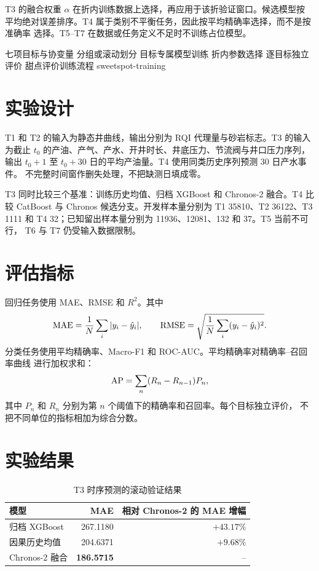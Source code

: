 T3 的融合权重 $\alpha$ 在折内训练数据上选择，再应用于该折验证窗口。候选模型按
平均绝对误差排序。T4 属于类别不平衡任务，因此按平均精确率选择，而不是按准确率
选择。T5--T7 在数据或任务定义不足时不训练占位模型。

\TrainingFlow
  {七项目标与协变量}
  {分组或滚动划分}
  {目标专属模型训练}
  {折内参数选择}
  {逐目标独立评价}
  {甜点评价训练流程}
  {sweetspot-training}

\section{实验设计}

T1 和 T2 的输入为静态井曲线，输出分别为 RQI 代理量与砂岩标志。T3 的输入为截止
$t_0$ 的产油、产气、产水、开井时长、井底压力、节流阀与井口压力序列，输出
$t_0+1$ 至 $t_0+30$ 日的平均产油量。T4 使用同类历史序列预测 30 日产水事件。
不完整时间窗作删失处理，不把缺测日填成零。

T3 同时比较三个基准：训练历史均值、归档 XGBoost 和 Chronos-2 融合。T4 比较
CatBoost 与 Chronos 候选分支。开发样本量分别为 T1 35810、T2 36122、T3 1111
和 T4 32；已知留出样本量分别为 11936、12081、132 和 37。T5 当前不可行，
T6 与 T7 仍受输入数据限制。

\section{评估指标}

回归任务使用 MAE、RMSE 和 $R^2$。其中
\begin{equation}
  \mathrm{MAE}=\frac{1}{N}\sum_i|y_i-\hat{y}_i|,
  \qquad
  \mathrm{RMSE}=\sqrt{\frac{1}{N}\sum_i(y_i-\hat{y}_i)^2}.
\end{equation}
分类任务使用平均精确率、Macro-F1 和 ROC-AUC。平均精确率对精确率--召回率曲线
进行加权求和：
\begin{equation}
  \mathrm{AP}=\sum_n(R_n-R_{n-1})P_n,
\end{equation}
其中 $P_n$ 和 $R_n$ 分别为第 $n$ 个阈值下的精确率和召回率。每个目标独立评价，
不把不同单位的指标相加为综合分数。

\section{实验结果}

\begin{table}[htbp]
  \centering
  \caption{T3 时序预测的滚动验证结果}
  \label{tab:sweetspot-t3-dev}
  \begin{tabular}{lrr}
    \toprule
    模型 & MAE & 相对 Chronos-2 的 MAE 增幅 \\
    \midrule
    归档 XGBoost & 267.1180 & $+43.17\%$ \\
    因果历史均值 & 204.6371 & $+9.68\%$ \\
    Chronos-2 融合 & \textbf{186.5715} & -- \\
    \bottomrule
  \end{tabular}
\end{table}

